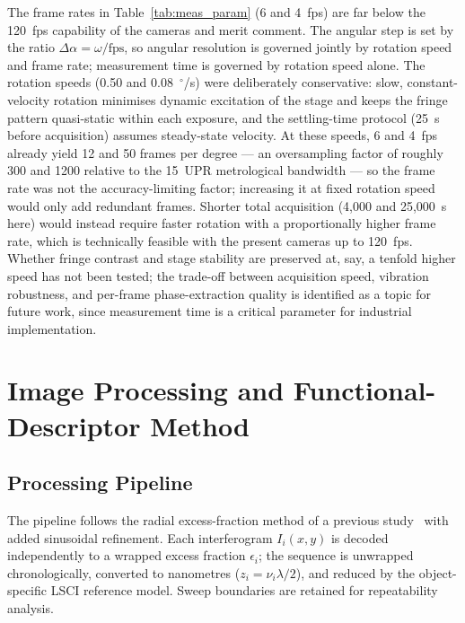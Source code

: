 \documentclass[review]{elsarticle}
\begin{document}
The frame rates in Table~\ref{tab:meas_param} (6 and 4~fps) are far below the 120~fps capability of the cameras and merit comment. The angular step is set by the ratio $\Delta\alpha=\omega/\mathrm{fps}$, so angular resolution is governed jointly by rotation speed and frame rate; measurement time is governed by rotation speed alone. The rotation speeds (0.50 and 0.08~$^\circ$/s) were deliberately conservative: slow, constant-velocity rotation minimises dynamic excitation of the stage and keeps the fringe pattern quasi-static within each exposure, and the settling-time protocol (25~s before acquisition) assumes steady-state velocity. At these speeds, 6 and 4~fps already yield 12 and 50 frames per degree — an oversampling factor of roughly 300 and 1200 relative to the 15~UPR metrological bandwidth — so the frame rate was not the accuracy-limiting factor; increasing it at fixed rotation speed would only add redundant frames. Shorter total acquisition (4,000 and 25,000~s here) would instead require faster rotation with a proportionally higher frame rate, which is technically feasible with the present cameras up to 120~fps. Whether fringe contrast and stage stability are preserved at, say, a tenfold higher speed has not been tested; the trade-off between acquisition speed, vibration robustness, and per-frame phase-extraction quality is identified as a topic for future work, since measurement time is a critical parameter for industrial implementation.


\section{Image Processing and Functional-Descriptor Method}

\subsection{Processing Pipeline}
The pipeline follows the radial excess-fraction method of a previous study~\cite{kucharski2025radial-0ca} with added sinusoidal refinement. Each interferogram $I_i(x,y)$ is decoded independently to a wrapped excess fraction $\epsilon_i$; the sequence is unwrapped chronologically, converted to nanometres ($z_i = \nu_i\lambda/2$), and reduced by the object-specific LSCI reference model. Sweep boundaries are retained for repeatability analysis.
\end{document}
